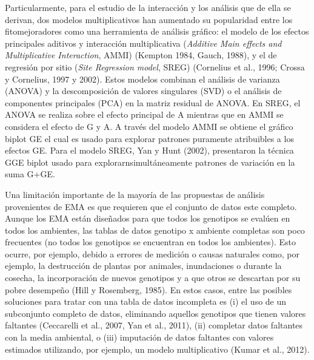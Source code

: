 Particularmente, para el estudio de la interacción y los análisis que de ella se derivan, dos modelos multiplicativos han aumentado su popularidad entre los fitomejoradores como una herramienta de análisis gráfico: el modelo de los efectos principales aditivos y interacción multiplicativa (\emph{Additive Main effects and Multiplicative Interaction}, AMMI) (Kempton 1984, Gauch, 1988), y el de regresión por sitio (\emph{Site Regression model}, SREG) (Cornelius et al., 1996; Crossa y Cornelius, 1997 y 2002).  Estos modelos combinan el análisis de varianza (ANOVA) y la descomposición de valores singulares (SVD) o el análisis de componentes principales (PCA) en la matriz residual de ANOVA. En SREG, el ANOVA se realiza sobre el efecto principal de A mientras que en AMMI se considera el efecto de G y A. A través del modelo AMMI se obtiene el gráfico biplot GE el cual es usado para explorar patrones puramente atribuibles a los efectos GE. Para el modelo SREG, Yan y Hunt (2002), presentaron la técnica GGE biplot usado para explorarnsimultáneamente patrones de variación en la suma G+GE.

Una limitación importante de la mayoría de las propuestas de análisis provenientes de EMA es que requieren que el conjunto de datos este completo. Aunque los EMA están diseñados para que todos los genotipos se evalúen en todos los ambientes,  las tablas de datos genotipo x ambiente completas son poco frecuentes (no todos los genotipos se encuentran en todos los ambientes). Esto ocurre, por ejemplo, debido a errores de medición o causas naturales como, por ejemplo, la destrucción de plantas por animales, inundaciones o durante la cosecha, la incorporación de nuevos genotipos y a que otros se descartan por su pobre desempeño (Hill y Rosemberg, 1985). En estos casos, entre las posibles soluciones para tratar con una tabla de datos incompleta es (i) el uso de un subconjunto completo de datos, eliminando aquellos genotipos que tienen valores faltantes (Ceccarelli et al., 2007, Yan et al., 2011), (ii) completar datos faltantes con la media ambiental, o (iii) imputación de datos faltantes con valores estimados utilizando, por ejemplo, un modelo multiplicativo (Kumar et al., 2012). 

